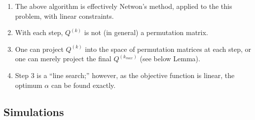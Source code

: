 \begin{Rem}

\begin{enumerate}
\item The above algorithm is effectively Netwon's method, applied to the this problem, with linear constraints.  
\item With each step, $Q^{(k)}$ is not (in general) a permutation matrix.  
\item One can project $Q^{(k)}$ into the space of permutation matrices at each step, or one can merely project the final $Q^{(k_{max})}$ (see below Lemma).
\item Step 3 is a ``line search;'' however, as the objective function is linear, the optimum $\alpha$ can be found exactly.
\end{enumerate}
\end{Rem}





\subsection{Simulations} %
\label{sub:simulations}

